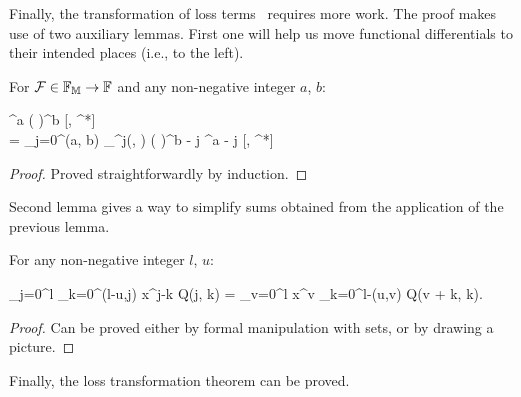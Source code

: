 Finally, the transformation of loss terms~ requires more work.
The proof makes use of two auxiliary lemmas.
First one will help us move functional differentials to their intended places (i.e., to the left).

\begin{lemma}
\label{lmm:transformations:swap-differential}
    For $\mathcal{F} \in \mathbb{F}_{\mathbb{M}} \rightarrow \mathbb{F}$ and any non-negative integer $a$, $b$:
    \begin{eqn*}
    	\Psi^a \left( \frac{\delta}{\delta \Psi} \right)^b [\Psi, \Psi^*] \\
    	= \sum_{j=0}^{\min(a, b)}
    		 
    		\delta_{\restbasis}^j(\xvec, \xvec)
    		\left( \frac{\delta}{\delta \Psi} \right)^{b - j}
    		\Psi^{a - j}
    		[\Psi, \Psi^*]
    \end{eqn*}
\end{lemma}
\begin{proof}
Proved straightforwardly by induction.
\end{proof}

Second lemma gives a way to simplify sums obtained from the application of the previous lemma.

\begin{lemma}
\label{lmm:transformations:sum-rearrangement}
    For any non-negative integer $l$, $u$:
    \begin{eqn*}
    	\sum_{j=0}^l \sum_{k=0}^{\min(l-u,j)} x^{j-k} Q(j, k)
    	= \sum_{v=0}^l x^v \sum_{k=0}^{l-\max(u,v)} Q(v + k, k).
    \end{eqn*}
\end{lemma}
\begin{proof}
Can be proved either by formal manipulation with sets, or by drawing a picture.
\end{proof}

Finally, the loss transformation theorem can be proved.

